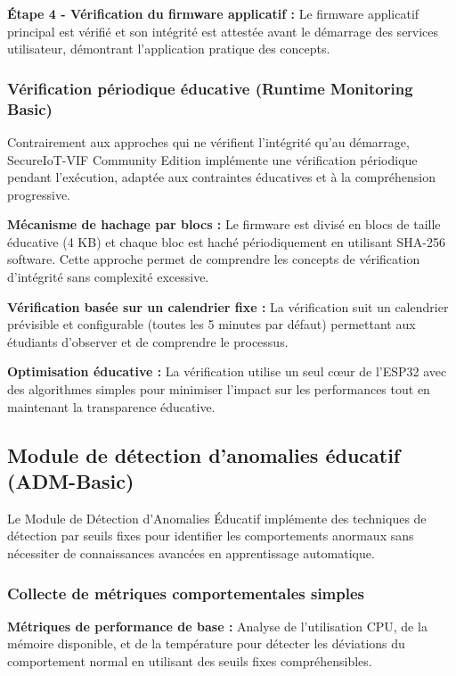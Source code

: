 \textbf{Étape 4 - Vérification du firmware applicatif :} Le firmware applicatif principal est vérifié et son intégrité est attestée avant le démarrage des services utilisateur, démontrant l'application pratique des concepts.

\subsubsection{Vérification périodique éducative (Runtime Monitoring Basic)}

Contrairement aux approches qui ne vérifient l'intégrité qu'au démarrage, SecureIoT-VIF Community Edition implémente une vérification périodique pendant l'exécution, adaptée aux contraintes éducatives et à la compréhension progressive.

\textbf{Mécanisme de hachage par blocs :} Le firmware est divisé en blocs de taille éducative (4 KB) et chaque bloc est haché périodiquement en utilisant SHA-256 software. Cette approche permet de comprendre les concepts de vérification d'intégrité sans complexité excessive.

\textbf{Vérification basée sur un calendrier fixe :} La vérification suit un calendrier prévisible et configurable (toutes les 5 minutes par défaut) permettant aux étudiants d'observer et de comprendre le processus.

\textbf{Optimisation éducative :} La vérification utilise un seul cœur de l'ESP32 avec des algorithmes simples pour minimiser l'impact sur les performances tout en maintenant la transparence éducative.

\subsection{Module de détection d'anomalies éducatif (ADM-Basic)}

Le Module de Détection d'Anomalies Éducatif implémente des techniques de détection par seuils fixes pour identifier les comportements anormaux sans nécessiter de connaissances avancées en apprentissage automatique.

\subsubsection{Collecte de métriques comportementales simples}

\textbf{Métriques de performance de base :} Analyse de l'utilisation CPU, de la mémoire disponible, et de la température pour détecter les déviations du comportement normal en utilisant des seuils fixes compréhensibles.

